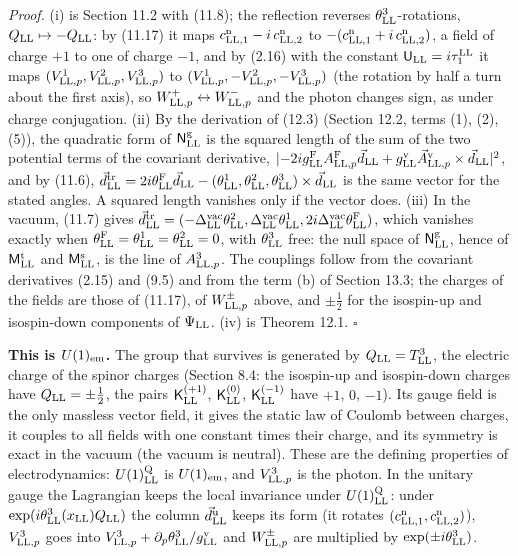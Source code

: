 \documentclass[
  10pt,
]{article}
\begin{document}
\emph{Proof.} (i) is Section 11.2 with (11.8); the reflection reverses
\(\theta^3_{\rm LL}\)-rotations, \(Q_{\rm LL}\mapsto-Q_{\rm LL}\): by
(11.17) it maps \(c^{\rm n}_{{\rm LL},1}-i\,c^{\rm n}_{{\rm LL},2}\) to
\(-(c^{\rm n}_{{\rm LL},1}+i\,c^{\rm n}_{{\rm LL},2})\), a field of
charge \(+1\) to one of charge \(-1\), and by (2.16) with the constant
\(\mathsf U_{\rm LL}=i\tau^{\rm LL}_1\) it maps
\((V^1_{{\rm LL},p},V^2_{{\rm LL},p},V^3_{{\rm LL},p})\) to
\((V^1_{{\rm LL},p},-V^2_{{\rm LL},p},-V^3_{{\rm LL},p})\) (the rotation
by half a turn about the first axis), so
\(W^+_{{\rm LL},p}\leftrightarrow W^-_{{\rm LL},p}\) and the photon
changes sign, as under charge conjugation. (ii) By the derivation of
(12.3) (Section 12.2, terms (1), (2), (5)), the quadratic form of
\(\mathsf N^{\rm g}_{\rm LL}\) is the squared length of the sum of the
two potential terms of the covariant derivative,
\(\lvert-2ig^{\rm F}_{\rm LL}A^{\rm F}_{{\rm LL},p}\vec d_{\rm LL}+g^{\rm v}_{\rm LL}\vec A^{\rm v}_{{\rm LL},p}\times\vec d_{\rm LL}\rvert^2\),
and by (11.6),
\(\vec d^{\rm tr}_{\rm LL}=2i\theta^{\rm F}_{\rm LL}\vec d_{\rm LL}-(\theta^1_{\rm LL},\theta^2_{\rm LL},\theta^3_{\rm LL})\times\vec d_{\rm LL}\)
is the same vector for the stated angles. A squared length vanishes only
if the vector does. (iii) In the vacuum, (11.7) gives
\(\vec d^{\rm tr}_{\rm LL}=(-\Delta^{\rm vac}_{\rm LL}\theta^2_{\rm LL},\Delta^{\rm vac}_{\rm LL}\theta^1_{\rm LL},2i\Delta^{\rm vac}_{\rm LL}\theta^{\rm F}_{\rm LL})\),
which vanishes exactly when
\(\theta^{\rm F}_{\rm LL}=\theta^1_{\rm LL}=\theta^2_{\rm LL}=0\), with
\(\theta^3_{\rm LL}\) free: the null space of
\(\mathsf N^{\rm g}_{\rm LL}\), hence of \(\mathsf M^{\rm t}_{\rm LL}\)
and \(\mathsf M^{\rm s}_{\rm LL}\), is the line of \(A^3_{{\rm LL},p}\).
The couplings follow from the covariant derivatives (2.15) and (9.5) and
from the term (b) of Section 13.3; the charges of the fields are those
of (11.17), of \(W^\pm_{{\rm LL},p}\) above, and \(\pm\tfrac12\) for the
isospin-up and isospin-down components of \(\Psi_{\rm LL}\). (iv) is
Theorem 12.1. \(\square\)

\textbf{This is \(U(1)_{\rm em}\).} The group that survives is generated
by \(Q_{\rm LL}=T^3_{\rm LL}\), the electric charge of the spinor
charges (Section 8.4: the isospin-up and isospin-down charges have
\(Q_{\rm LL}=\pm\tfrac12\), the pairs \(\mathsf K^{(+1)}_{\rm LL}\),
\(\mathsf K^{(0)}_{\rm LL}\), \(\mathsf K^{(-1)}_{\rm LL}\) have \(+1\),
\(0\), \(-1\)). Its gauge field is the only massless vector field, it
gives the static law of Coulomb between charges, it couples to all
fields with one constant times their charge, and its symmetry is exact
in the vacuum (the vacuum is neutral). These are the defining properties
of electrodynamics: \(U(1)^{\rm Q}_{\rm LL}\) is \(U(1)_{\rm em}\), and
\(V^3_{{\rm LL},p}\) is the photon. In the unitary gauge the Lagrangian
keeps the local invariance under \(U(1)^{\rm Q}_{\rm LL}\): under
\(\exp(i\theta^3_{\rm LL}(x_{\rm LL})Q_{\rm LL})\) the column
\(\vec d^{\rm u}_{\rm LL}\) keeps its form (it rotates
\((c^{\rm n}_{{\rm LL},1},c^{\rm n}_{{\rm LL},2})\)),
\(V^3_{{\rm LL},p}\) goes into
\(V^3_{{\rm LL},p}+\partial_p\theta^3_{\rm LL}/g^{\rm v}_{\rm LL}\) and
\(W^\pm_{{\rm LL},p}\) are multiplied by
\(\exp(\pm i\theta^3_{\rm LL})\).
\end{document}
